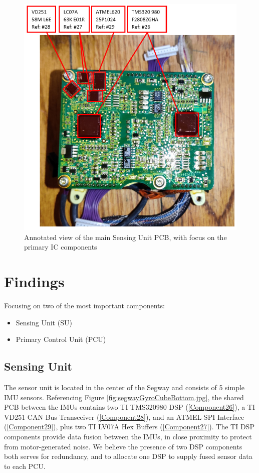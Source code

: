 \documentclass[]{formalLabReport}
\begin{document}
\begin{figure}
    \includegraphics[]{annotatedGyroCubeBottom.png}
    \caption{Annotated view of the main Sensing Unit PCB, with focus on the primary IC components}
    \label{fig:annotatedGyroCubeBottom.jpg}
\end{figure}

\section{Findings}
Focusing on two of the most important components:
\begin{itemize}
    \item Sensing Unit (SU)
    \item Primary Control Unit (PCU)
\end{itemize}

\subsection{Sensing Unit}
The sensor unit is located in the center of the Segway and consists of 5 simple IMU sensors. Referencing Figure \ref{fig:segwayGyroCubeBottom.jpg}, the shared PCB between the IMUs contains two TI TMS320980 DSP (\ref{Component26}), a TI VD251 CAN Bus Transceiver (\ref{Component28}), and an ATMEL SPI Interface (\ref{Component29}), plus two TI LV07A Hex Buffers (\ref{Component27}). The TI DSP components provide data fusion between the IMUs, in close proximity to protect from motor-generated noise. We believe the presence of two DSP components both serves for redundancy, and to allocate one DSP to supply fused sensor data to each PCU.
\end{document}
